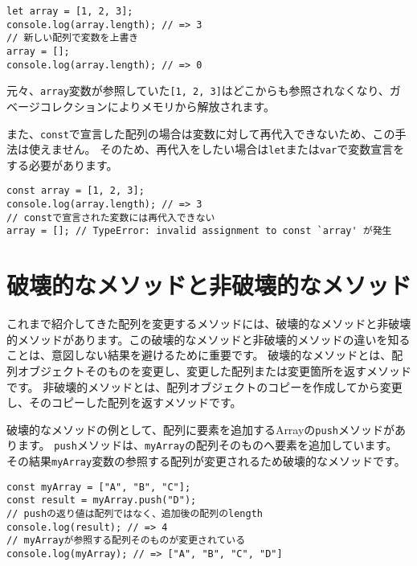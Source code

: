 \begin{lstlisting}
let array = [1, 2, 3];
console.log(array.length); // => 3
// 新しい配列で変数を上書き
array = [];
console.log(array.length); // => 0
\end{lstlisting}

元々、\texttt{array}変数が参照していた\texttt{[1, 2, 3]}はどこからも参照されなくなり、ガベージコレクションによりメモリから解放されます。

また、\texttt{const}で宣言した配列の場合は変数に対して再代入できないため、この手法は使えません。
そのため、再代入をしたい場合は\texttt{let}または\texttt{var}で変数宣言をする必要があります。

\begin{lstlisting}
const array = [1, 2, 3];
console.log(array.length); // => 3
// constで宣言された変数には再代入できない
array = []; // TypeError: invalid assignment to const `array' が発生
\end{lstlisting}

\hypertarget{mutable-immutable}{%
\section{破壊的なメソッドと非破壊的なメソッド}\label{mutable-immutable}}

これまで紹介してきた配列を変更するメソッドには、破壊的なメソッドと非破壊的メソッドがあります。この破壊的なメソッドと非破壊的メソッドの違いを知ることは、意図しない結果を避けるために重要です。
破壊的なメソッドとは、配列オブジェクトそのものを変更し、変更した配列または変更箇所を返すメソッドです。
非破壊的メソッドとは、配列オブジェクトのコピーを作成してから変更し、そのコピーした配列を返すメソッドです。

破壊的なメソッドの例として、配列に要素を追加するArrayの\texttt{push}メソッドがあります。
\texttt{push}メソッドは、\texttt{myArray}の配列そのものへ要素を追加しています。
その結果\texttt{myArray}変数の参照する配列が変更されるため破壊的なメソッドです。

\begin{lstlisting}
const myArray = ["A", "B", "C"];
const result = myArray.push("D"); 
// pushの返り値は配列ではなく、追加後の配列のlength
console.log(result); // => 4
// myArrayが参照する配列そのものが変更されている
console.log(myArray); // => ["A", "B", "C", "D"]
\end{lstlisting}

